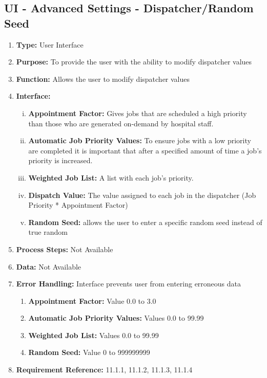 \documentclass[paper=letter, fontsize=10pt]{scrartcl}
\numberwithin{equation}{section}		%
\numberwithin{figure}{section}			%
\numberwithin{table}{section}				%
\begin{document}
\subsection{UI - Advanced Settings - Dispatcher/Random Seed}
\begin{enumerate}[]
	\item \textbf{Type:} User Interface
	\item \textbf{Purpose:} To provide the user with the ability to modify dispatcher values
	\item \textbf{Function:} Allows the user to modify dispatcher values
	\item \textbf{Interface:}  
	\begin{enumerate}[(i)]
		\item \textbf{Appointment Factor:} Gives jobs that are scheduled a high priority than those who are generated on-demand by hospital staff.
		\item \textbf{Automatic Job Priority Values:}  To ensure jobs with a low priority are completed it is important that after a specified amount of time a job's priority is increased.  
		\item \textbf{Weighted Job List:} A list with each job's priority.
		\item \textbf{Dispatch Value:} The value assigned to each job in the dispatcher (Job Priority * Appointment Factor)
		\item \textbf{Random Seed:} allows the user to enter a specific random seed instead of true random
	\end{enumerate}
	\item \textbf{Process Steps:} Not Available
	\item \textbf{Data:} Not Available
	\item \textbf{Error Handling:} Interface prevents user from entering erroneous data 
	\begin{enumerate}[]
		\item \textbf{Appointment Factor:} Value 0.0 to 3.0
		\item \textbf{Automatic Job Priority Values:} Values 0.0 to 99.99
		\item \textbf{Weighted Job List:} Values 0.0 to 99.99
		\item \textbf{Random Seed:} Value 0 to 999999999
	\end{enumerate}
	\item \textbf{Requirement Reference:} 11.1.1, 11.1.2, 11.1.3, 11.1.4
\end{enumerate}
\end{document}
